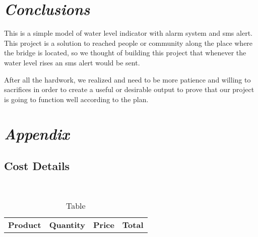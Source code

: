 \documentclass[11pt]{article}
\begin{document}
{\section{\emph{Conclusions}}

This is a simple model of water level indicator with alarm system and sms alert. This project is a solution to reached people or community along the place where the bridge is located, so we thought of building this project that whenever the water level rises an sms alert would be sent.

After all the hardwork, we realized and need to be more patience and willing to sacrifices in order to create a useful or desirable output to prove that our project is going to function well according to the plan.

\section{\emph{Appendix}}

\subsection{Cost Details}\

\begin{table}[h!]
\begin{center}
\caption{Table}
\label{tab:table1}
\begin{tabular}{|l|l|l|l|}

\hline
              \textbf{Product} & \textbf{Quantity} & \textbf{Price} & \textbf{Total}\\


\end{tabular}
\end{center}
\end{table}}
\end{document}
